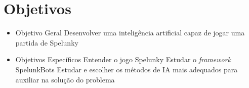 \chapter{\label{chap:objectives}Objetivos}


\begin{itemize}
    \item Objetivo Geral
        \subitem Desenvolver uma inteligência artificial capaz de jogar uma partida de Spelunky
    \item Objetivos Específicos
        \subitem Entender o jogo Spelunky
        \subitem Estudar o \textit{framework} SpelunkBots
        \subitem Estudar e escolher os métodos de IA mais adequados para auxiliar na solução do problema
\end{itemize}
